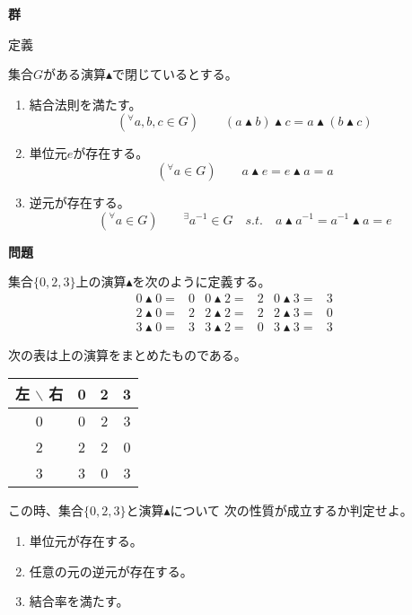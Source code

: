 \documentclass[12pt,b5paper]{ltjsarticle}
\begin{document}
\hrulefill
\textbf{群}
\hrulefill

定義

集合$G$がある演算$\blacktriangle$で閉じているとする。

\begin{enumerate}
 \item
      結合法則を満たす。
      \begin{equation}
       ({}^{\forall} a,b,c \in G) \qquad
        (a \blacktriangle b) \blacktriangle c = a \blacktriangle (b \blacktriangle c)
      \end{equation}

 \item
      単位元$e$が存在する。
      \begin{equation}
       ({}^{\forall} a \in G) \qquad
        a \blacktriangle e = e \blacktriangle a = a
      \end{equation}

 \item
      逆元が存在する。
      \begin{equation}
       ({}^{\forall} a \in G) \qquad
        {}^\exists a^{-1} \in G \quad
        s.t. \quad a \blacktriangle a^{-1} = a^{-1} \blacktriangle a = e
      \end{equation}
\end{enumerate}


\hrulefill
\textbf{問題}
\hrulefill



集合$\{0,2,3\}$上の演算$\blacktriangle$を次のように定義する。
\begin{align}
 0\blacktriangle0 =& 0 & 0\blacktriangle2 =& 2 & 0\blacktriangle3 =& 3\\
 2\blacktriangle0 =& 2 & 2\blacktriangle2 =& 2 & 2\blacktriangle3 =& 0\\
 3\blacktriangle0 =& 3 & 3\blacktriangle2 =& 0 & 3\blacktriangle3 =& 3
\end{align}

次の表は上の演算をまとめたものである。
\begin{center}
 \begin{tabular}{|c||c|c|c|}
  \hline
  左 $\backslash$ 右 & 0 & 2 & 3 \\
  \hline \hline
  0 & 0 & 2 & 3 \\ \hline
  2 & 2 & 2 & 0 \\ \hline
  3 & 3 & 0 & 3 \\ \hline
 \end{tabular}
\end{center}
この時、集合$\{0,2,3\}$と演算$\blacktriangle$について
次の性質が成立するか判定せよ。
\begin{enumerate}
 \item 単位元が存在する。
 \item 任意の元の逆元が存在する。
 \item 結合率を満たす。
\end{enumerate}
\end{document}
